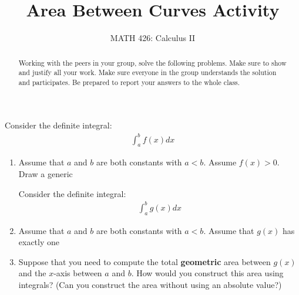 \documentclass{ximera}
\title{Area Between Curves Activity}
\author{MATH 426: Calculus II}
\begin{document}
\begin{abstract}
   Working with the peers in your group, solve the following problems. Make sure to show and justify all your work. Make sure everyone in the group understands the solution and participates. Be prepared to report your answers to the whole class. 
\end{abstract}
\maketitle

\begin{exercise}
Consider the definite integral:
\begin{align}
	\int_{a}^b f(x) dx \nonumber
\end{align}
   \begin{enumerate}
       \item Assume that $a$ and $b$ are both constants with $a < b$. Assume $f(x)>0$. Draw a generic %
       
        Consider the definite integral:
\begin{align}
	\int_{a}^b g(x) dx \nonumber
\end{align}
       \item Assume that $a$ and $b$ are both constants with $a < b$. Assume that $g(x)$ has exactly one %
       \item Suppose that you need to compute the total {\bf{geometric}} area between $g(x)$ and the $x$-axis between $a$ and $b$. How would you construct this area using integrals? (Can you construct the area without using an absolute value?)
   \end{enumerate}

\end{exercise}
\end{document}
